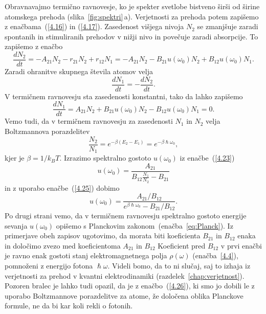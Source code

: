Obravnavajmo termično ravnovesje, ko je spekter svetlobe bistveno širši
od širine atomskega prehoda (slika~\ref{fig:spektri}\,a). Verjetnosti za prehoda potem
zapišemo z enačbama~(\ref{4.16}) in (\ref{4.17}). Zasedenost višjega nivoja $N_2$
se zmanjšuje zaradi spontanih in stimuliranih prehodov v nižji nivo in
povečuje zaradi absorpcije. To zapišemo z enačbo
\begin{equation}
\frac{dN_{2}}{dt}=-A_{21}N_2 - r_{21}N_2 + r_{12}N_1 = 
-A_{21}N_{2}-B_{21}u(\omega_{0})N_{2}+B_{12}u(\omega_{0})N_{1}.
\label{4.22}
\end{equation}
Zaradi ohranitve skupnega števila atomov velja 
\begin{equation}
\frac{dN_{1}}{dt}=-\frac{dN_{2}}{dt}.
\end{equation}
V termičnem ravnovesju sta zasedenosti konstantni, tako da lahko zapišemo 
\begin{equation}
\frac{dN_{1}}{dt}=A_{21}N_{2}+B_{21}u(\omega_{0})N_{2}-B_{12}u(\omega_{0})N_{1}=0.
\label{4.23}
\end{equation}
Vemo tudi, da v termičnem ravnovesju za zasedenosti $N_{1}$ in $N_{2}$ velja
Boltzmannova porazdelitev
\begin{equation}
\frac{N_{2}}{N_{1}}=e^{-\beta(E_{2}-E_{1})} = e^{-\beta \hslash \omega_0},
\label{4.25}
\end{equation}
kjer je $\beta=1/k_BT$. Izrazimo spektralno gostoto $u(\omega_0)$ 
iz enačbe~(\ref{4.23})
\begin{equation}
u(\omega_{0})=\frac{A_{21}}{B_{12}\frac{N_{1}}{N_{2}}-B_{21}}
\label{4.24}
\end{equation}
in z uporabo enačbe~(\ref{4.25}) dobimo
\begin{equation}
u(\omega_{0})=\frac{A_{21}/B_{12}}{e^{\beta\hslash\omega_{0}}-B_{21}/B_{12}}.
\label{4.26}
\end{equation}
Po drugi strani vemo, da v termičnem ravnovesju spektralno gostoto energije sevanja
$u(\omega_0)$ opišemo s Planckovim zakonom~(enačba~\ref{eq:Planck}).
Iz primerjave obeh zapisov ugotovimo, da morata biti koeficienta $B_{21}$ in $B_{12}$ enaka in
določimo zvezo med koeficientoma $A_{21}$ in $B_{12}$  
Koeficient pred $B_{12}$ v prvi enačbi je ravno enak gostoti stanj elektromagnetnega polja 
$\rho(\omega)$ (enačba~\ref{4.4}), pomnoženi z energijo fotona $\hslash\omega$. 
Videli bomo, da to ni slučaj, saj to izhaja iz verjetnosti za prehod v kvantni 
elektrodinamiki (razdelek~\ref{chap:verjetnost}).
Pozoren bralec je lahko tudi opazil, da je z enačbo~(\ref{4.26}),
ki smo jo dobili le z uporabo Boltzmannove porazdelitve za atome, že
določena oblika Planckove formule, ne da bi kar koli rekli o fotonih.

